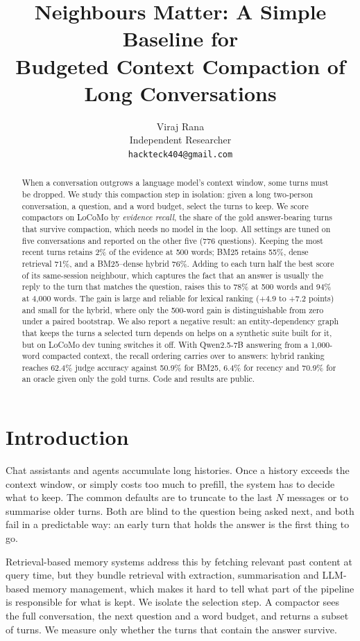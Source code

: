 \documentclass[11pt]{article}
\title{Neighbours Matter: A Simple Baseline for\\Budgeted Context Compaction of Long Conversations}
\author{Viraj Rana\\Independent Researcher\\\texttt{hackteck404@gmail.com}}
\date{}
\begin{document}
\maketitle

\begin{abstract}
When a conversation outgrows a language model's context window, some turns must be dropped.
We study this compaction step in isolation: given a long two-person conversation, a question,
and a word budget, select the turns to keep. We score compactors on LoCoMo by
\emph{evidence recall}, the share of the gold answer-bearing turns that survive compaction,
which needs no model in the loop. All settings are tuned on five conversations and reported on
the other five (776 questions). Keeping the most recent turns retains 2\% of the evidence at
500 words; BM25 retains 55\%, dense retrieval 71\%, and a BM25--dense hybrid 76\%. Adding to each
turn half the best score of its same-session neighbour, which captures the fact that an answer
is usually the reply to the turn that matches the question, raises this to 78\% at 500 words and
94\% at 4,000 words. The gain is large and reliable for lexical ranking (+4.9 to +7.2 points)
and small for the hybrid, where only the 500-word gain is distinguishable from zero under a
paired bootstrap. We also report a negative result: an entity-dependency graph that
keeps the turns a selected turn depends on helps on a synthetic suite built for it, but on
LoCoMo dev tuning switches it off. With Qwen2.5-7B answering from a 1,000-word compacted
context, the recall ordering carries over to answers: hybrid ranking reaches 62.4\% judge
accuracy against 50.9\% for BM25, 6.4\% for recency and 70.9\% for an oracle given only the gold
turns. Code and results are public.
\end{abstract}

\section{Introduction}

Chat assistants and agents accumulate long histories. Once a history exceeds the context window,
or simply costs too much to prefill, the system has to decide what to keep. The common defaults
are to truncate to the last $N$ messages or to summarise older turns. Both are blind to the
question being asked next, and both fail in a predictable way: an early turn that holds the
answer is the first thing to go.

Retrieval-based memory systems \citep{packer2023memgpt,chhikara2025mem0,zhong2024memorybank}
address this by fetching relevant past content at query time, but they bundle retrieval with
extraction, summarisation and LLM-based memory management, which makes it hard to tell what part
of the pipeline is responsible for what is kept. We isolate the selection step. A compactor sees
the full conversation, the next question and a word budget, and returns a subset of turns. We
measure only whether the turns that contain the answer survive.
\end{document}
